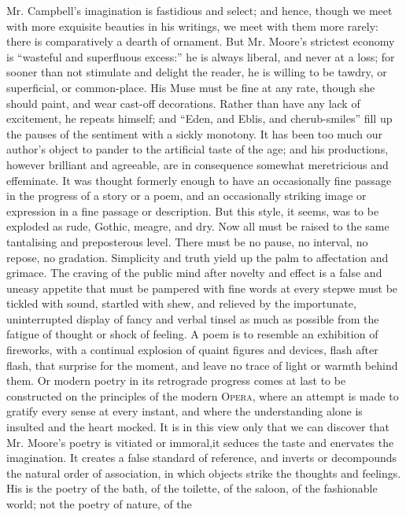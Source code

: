 Mr. Campbell's imagination is fastidious and select; and hence,
though we meet with more exquisite beauties in his writings, we
meet with them more rarely: there is comparatively a dearth of
ornament. But Mr.  Moore's strictest economy is ``wasteful and
superfluous excess:'' he is always liberal, and never at a loss;
for sooner than not stimulate and delight the reader, he is
willing to be tawdry, or superficial, or common-place. His Muse
must be fine at any rate, though she should paint, and wear
cast-off decorations. Rather than have any lack of excitement, he
repeats himself; and ``Eden, and Eblis, and cherub-smiles'' fill
up the pauses of the sentiment with a sickly monotony.\textemdash
It has been too much our author's object to pander to the
artificial taste of the age; and his productions, however
brilliant and agreeable, are in consequence somewhat meretricious
and effeminate. It was thought formerly enough to have an
occasionally fine passage in the progress of a story or a poem,
and an occasionally striking image or expression in a fine passage
or description. But this style, it seems, was to be exploded as
rude, Gothic, meagre, and dry. Now all must be raised to the same
tantalising and preposterous level. There must be no pause, no
interval, no repose, no gradation. Simplicity and truth yield up
the palm to affectation and grimace. The craving of the public
mind after novelty and effect is a false and uneasy appetite that
must be pampered with fine words at every step\textemdash we must
be tickled with sound, startled with shew, and relieved by the
importunate, uninterrupted display of fancy and verbal tinsel as
much as possible from the fatigue of thought or shock of
feeling. A poem is to resemble an exhibition of fireworks, with a
continual explosion of quaint figures and devices, flash after
flash, that surprise for the moment, and leave no trace of light
or warmth behind them. Or modern poetry in its retrograde progress
comes at last to be constructed on the principles of the modern
\textsc{Opera}, where an attempt is made to gratify every sense at every
instant, and where the understanding alone is insulted and the
heart mocked. It is in this view only that we can discover that
Mr. Moore's poetry is vitiated or immoral,\textemdash it seduces
the taste and enervates the imagination. It creates a false
standard of reference, and inverts or decompounds the natural
order of association, in which objects strike the thoughts and
feelings.  His is the poetry of the bath, of the toilette, of the
saloon, of the fashionable world; not the poetry of nature, of the
